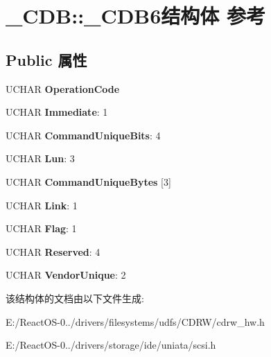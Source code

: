 \hypertarget{struct___c_d_b_1_1___c_d_b6}{}\section{\+\_\+\+C\+DB\+:\+:\+\_\+\+C\+D\+B6结构体 参考}
\label{struct___c_d_b_1_1___c_d_b6}
\subsection*{Public 属性}
\begin{DoxyCompactItemize}
\item 
\mbox{\label{struct___c_d_b_1_1___c_d_b6_a4b28ad2a8a42b25b454cec20273fe6b9}} 
U\+C\+H\+AR {\bfseries Operation\+Code}
\item 
\mbox{\label{struct___c_d_b_1_1___c_d_b6_a33ab9569839689e555fc1bf790e273f2}} 
U\+C\+H\+AR {\bfseries Immediate}\+: 1
\item 
\mbox{\label{struct___c_d_b_1_1___c_d_b6_abc92e88b9ecf14856df994d9d8ea122f}} 
U\+C\+H\+AR {\bfseries Command\+Unique\+Bits}\+: 4
\item 
\mbox{\label{struct___c_d_b_1_1___c_d_b6_a150b411bccf8e8a483802aa76422b4d6}} 
U\+C\+H\+AR {\bfseries Lun}\+: 3
\item 
\mbox{\label{struct___c_d_b_1_1___c_d_b6_a9e16f3062769afed786f8403551a1d1a}} 
U\+C\+H\+AR {\bfseries Command\+Unique\+Bytes} \mbox{[}3\mbox{]}
\item 
\mbox{\label{struct___c_d_b_1_1___c_d_b6_a9b64814b85dd9d55c5fe8f7f03d79d87}} 
U\+C\+H\+AR {\bfseries Link}\+: 1
\item 
\mbox{\label{struct___c_d_b_1_1___c_d_b6_afbf1b36d0754618bb54e18a4d43c8aaf}} 
U\+C\+H\+AR {\bfseries Flag}\+: 1
\item 
\mbox{\label{struct___c_d_b_1_1___c_d_b6_a2bd98edde18c14eac443d8b5006ce3d5}} 
U\+C\+H\+AR {\bfseries Reserved}\+: 4
\item 
\mbox{\label{struct___c_d_b_1_1___c_d_b6_a15509a2d467fa7b29cacf2810af516f4}} 
U\+C\+H\+AR {\bfseries Vendor\+Unique}\+: 2
\end{DoxyCompactItemize}


该结构体的文档由以下文件生成\+:\begin{DoxyCompactItemize}
\item 
E\+:/\+React\+O\+S-\/0../drivers/filesystems/udfs/\+C\+D\+R\+W/cdrw\+\_\+hw.\+h\item 
E\+:/\+React\+O\+S-\/0../drivers/storage/ide/uniata/scsi.\+h\end{DoxyCompactItemize}

